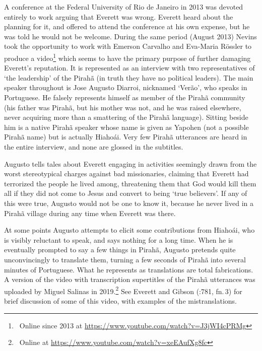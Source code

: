 \documentclass[output=paper,colorlinks,citecolor=brown
]{langscibook}
\begin{document}
A conference at the Federal University of Rio de Janeiro in 2013 was
devoted entirely to work arguing that Everett was wrong. Everett heard
about the planning for it, and offered to attend the conference at
his own expense, but he was told he would not be welcome. During the
same period (August 2013) Nevins took the opportunity to work with
Emerson Carvalho and Eva-Maria R{\"o}ssler to produce a video\footnote{\,
   Online since 2013 at
   \url{https://www.youtube.com/watch?v=J3jWI4cPRMg}}
which seems to have the primary purpose of further damaging Everett's
reputation. It is represented as an interview with two representatives
of `the leadership' of the Pirah{\~a} (in truth they have no political
leaders). The main speaker throughout is Jose Augusto Diarroi, nicknamed
`Ver{\~a}o', who speaks in Portuguese. He falsely represents himself as
member of the Pirah{\~a} community (his father was Pirah{\~a}, but
his mother was not, and he was raised elsewhere, never acquiring
more than a smattering of the Pirah{\~a} language). Sitting beside
him is a native Pirah{\~a} speaker whose name is given as Yapohen
(not a possible Pirah{\~a} name) but is actually Hiaho{\'a}i. Very
few Pirah{\~a} utterances are heard in the entire interview, and none
are glossed in the subtitles.

Augusto tells tales about Everett engaging in activities seemingly
drawn from the worst stereotypical charges against bad missionaries,
claiming that Everett had terrorized the people he lived among,
threatening them that God would kill them all if they did not come
to Jesus and convert to being `true believers'. If any of this were
true, Augusto would not be one to know it, because he never lived in
a Pirah{\~a} village during any time when Everett was there.

At some points Augusto attempts to elicit some contributions from
Hiaho{\'a}i, who is visibly reluctant to speak, and says nothing for
a long time. When he is eventually prompted to say a few things in
Pirah{\~a}, Augusto pretends quite unconvincingly to translate them,
turning a few seconds of Pirah{\~a} into several minutes of Portuguese.
What he represents as translations are total fabrications. A version
of the video with transcription supertitles of the Pirah{\~a} utterances
was uploaded by Miguel Salinas in 2019.\footnote{\,
   Online at \url{https://www.youtube.com/watch?v=xeEAufXg8fc}}
See Everett and Gibson (\citeyear{EverGibs19}:781, fn.\,3) for brief
discussion of some of this video, with examples of the mistranslations.
\end{document}

